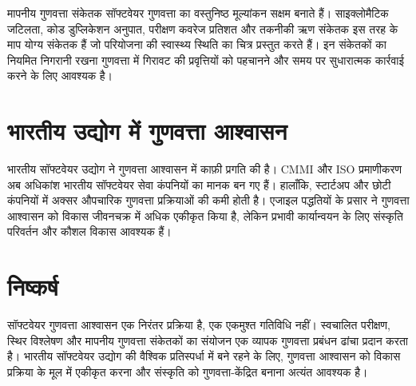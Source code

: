 \documentclass[
    language=hindi,
    doctype=article,
]{../../omnilatex}
\begin{document}
मापनीय गुणवत्ता संकेतक सॉफ्टवेयर गुणवत्ता का वस्तुनिष्ठ मूल्यांकन सक्षम बनाते हैं। साइक्लोमैटिक जटिलता, कोड डुप्लिकेशन अनुपात, परीक्षण कवरेज प्रतिशत और तकनीकी ऋण संकेतक इस तरह के माप योग्य संकेतक हैं जो परियोजना की स्वास्थ्य स्थिति का चित्र प्रस्तुत करते हैं। इन संकेतकों का नियमित निगरानी रखना गुणवत्ता में गिरावट की प्रवृत्तियों को पहचानने और समय पर सुधारात्मक कार्रवाई करने के लिए आवश्यक है।

\section{भारतीय उद्योग में गुणवत्ता आश्वासन}
भारतीय सॉफ्टवेयर उद्योग ने गुणवत्ता आश्वासन में काफ़ी प्रगति की है। CMMI और ISO प्रमाणीकरण अब अधिकांश भारतीय सॉफ्टवेयर सेवा कंपनियों का मानक बन गए हैं। हालाँकि, स्टार्टअप और छोटी कंपनियों में अक्सर औपचारिक गुणवत्ता प्रक्रियाओं की कमी होती है। एजाइल पद्धतियों के प्रसार ने गुणवत्ता आश्वासन को विकास जीवनचक्र में अधिक एकीकृत किया है, लेकिन प्रभावी कार्यान्वयन के लिए संस्कृति परिवर्तन और कौशल विकास आवश्यक हैं।

\section{निष्कर्ष}
सॉफ्टवेयर गुणवत्ता आश्वासन एक निरंतर प्रक्रिया है, एक एकमुश्त गतिविधि नहीं। स्वचालित परीक्षण, स्थिर विश्लेषण और मापनीय गुणवत्ता संकेतकों का संयोजन एक व्यापक गुणवत्ता प्रबंधन ढांचा प्रदान करता है। भारतीय सॉफ्टवेयर उद्योग की वैश्विक प्रतिस्पर्धा में बने रहने के लिए, गुणवत्ता आश्वासन को विकास प्रक्रिया के मूल में एकीकृत करना और संस्कृति को गुणवत्ता-केंद्रित बनाना अत्यंत आवश्यक है।
\end{document}
